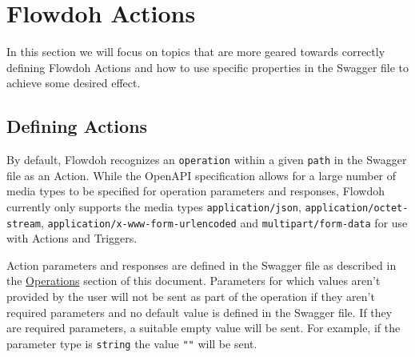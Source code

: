 \section{Flowdoh Actions}
\label{sec:actions}
In this section we will focus on topics that are more geared towards correctly defining Flowdoh Actions and how to use specific properties in the Swagger file to achieve some desired effect.
\subsection{Defining Actions}
By default, Flowdoh recognizes an \texttt{operation} within a given \texttt{path} in the Swagger file as an Action. While the OpenAPI specification allows for a large number of media types to be specified for operation parameters and responses, Flowdoh currently only supports the media types \texttt{application/json}, \texttt{application/octet-stream}, \texttt{application/x-www-form-urlencoded} and \texttt{multipart/form-data} for use with Actions and Triggers. 

Action parameters and responses are defined in the Swagger file as described in the \hyperref[subsubsec:operations]{Operations} section of this document. Parameters for which values aren't provided by the user will not be sent as part of the operation if they aren't required parameters and no default value is defined in the Swagger file. If they are required parameters, a suitable empty value will be sent. For example, if the parameter type is \texttt{string} the value \texttt{""} will be sent.


